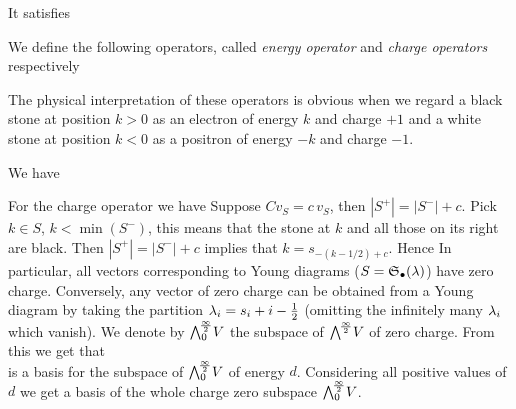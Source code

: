 \documentclass[10pt]{beamer}
\begin{document}
\begin{frame}

\begin{definition}
\vspace{-5pt}
\end{definition}

It satisfies\\[-15pt]

\begin{definition}
We define the following operators, called \emph{energy operator} and \emph{charge operators} respectively\\[-15pt]
\end{definition}

The physical interpretation of these operators is obvious when we regard a black stone at position $k>0$ as an electron of energy $k$ and charge $+1$ and a white stone at position $k<0$ as a positron of energy $-k$ and charge $-1$. 

We have\\[-15pt]

\end{frame}

\begin{frame}

For the charge operator we have 
Suppose $Cv_S=c\,v_S$, then $|S^+|=|S^-|+c$. Pick $k\in S$, $k<\min (S^-)$, this means that the stone at $k$ and all those on its right are black. Then $|S^+|=|S^-|+c$ implies that $k=s_{-(k-1/2)+c}$. Hence
In particular, all vectors corresponding to Young diagrams ($S=\mathfrak S_\bullet(\lambda)$) have zero charge. Conversely, any vector of zero charge can be obtained from a Young diagram by taking the partition $\lambda_i=s_i+i-\frac12$ (omitting the infinitely many $\lambda_i$ which vanish). We denote by $\bigwedge^{\!\frac\infty2}_0\!V$ the subspace of $\bigwedge^{\!\frac\infty2}\!V$ of zero charge. From this we get that\\[-15pt]
is a basis for the subspace of $\bigwedge^{\!\frac\infty2}_0\!V$ of energy $d$. Considering all positive values of $d$ we get a basis of the whole charge zero subspace $\bigwedge^{\!\frac\infty2}_0\!V$. 

\end{frame}
\end{document}
